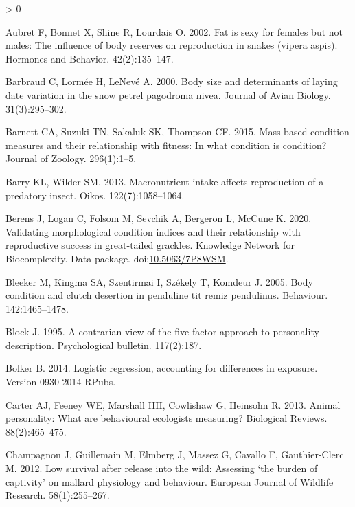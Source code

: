 \documentclass[
]{article}
\newlength{\cslhangindent}
\newenvironment{CSLReferences}[2] %
 {%
  \setlength{\parindent}{0pt}
  \ifodd #1 \everypar{\setlength{\hangindent}{\cslhangindent}}\ignorespaces\fi
  \ifnum #2 > 0
  \setlength{\parskip}{#2\baselineskip}
  \fi
 }%
 {}
\begin{document}
\hypertarget{refs}{}
\begin{CSLReferences}{0}{0}
\leavevmode\hypertarget{ref-aubret2002fat}{}%
Aubret F, Bonnet X, Shine R, Lourdais O. 2002. Fat is sexy for females
but not males: The influence of body reserves on reproduction in snakes
(vipera aspis). Hormones and Behavior. 42(2):135--147.

\leavevmode\hypertarget{ref-barbraud2000body}{}%
Barbraud C, Lormée H, LeNevé A. 2000. Body size and determinants of
laying date variation in the snow petrel pagodroma nivea. Journal of
Avian Biology. 31(3):295--302.

\leavevmode\hypertarget{ref-barnett2015mass}{}%
Barnett CA, Suzuki TN, Sakaluk SK, Thompson CF. 2015. Mass-based
condition measures and their relationship with fitness: In what
condition is condition? Journal of Zoology. 296(1):1--5.

\leavevmode\hypertarget{ref-barry2013macronutrient}{}%
Barry KL, Wilder SM. 2013. Macronutrient intake affects reproduction of
a predatory insect. Oikos. 122(7):1058--1064.

\leavevmode\hypertarget{ref-berens2020conditiondata}{}%
Berens J, Logan C, Folsom M, Sevchik A, Bergeron L, McCune K. 2020.
Validating morphological condition indices and their relationship with
reproductive success in great-tailed grackles. Knowledge Network for
Biocomplexity. Data package.
doi:\href{https://doi.org/10.5063/7P8WSM}{10.5063/7P8WSM}.

\leavevmode\hypertarget{ref-bleeker2005body}{}%
Bleeker M, Kingma SA, Szentirmai I, Székely T, Komdeur J. 2005. Body
condition and clutch desertion in penduline tit remiz pendulinus.
Behaviour. 142:1465--1478.

\leavevmode\hypertarget{ref-block1995contrarian}{}%
Block J. 1995. A contrarian view of the five-factor approach to
personality description. Psychological bulletin. 117(2):187.

\leavevmode\hypertarget{ref-bolker2014logistic}{}%
Bolker B. 2014. Logistic regression, accounting for differences in
exposure. Version 0930 2014 RPubs.

\leavevmode\hypertarget{ref-carter2013animal}{}%
Carter AJ, Feeney WE, Marshall HH, Cowlishaw G, Heinsohn R. 2013. Animal
personality: What are behavioural ecologists measuring? Biological
Reviews. 88(2):465--475.

\leavevmode\hypertarget{ref-champagnon2012low}{}%
Champagnon J, Guillemain M, Elmberg J, Massez G, Cavallo F,
Gauthier-Clerc M. 2012. Low survival after release into the wild:
Assessing {`the burden of captivity'} on mallard physiology and
behaviour. European Journal of Wildlife Research. 58(1):255--267.


\end{CSLReferences}
\end{document}
